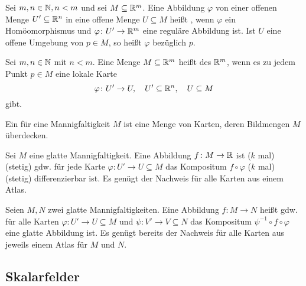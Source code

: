 \begin{definition}
Sei $m,n\in\mathbb N, n<m$ und sei $M\subseteq\mathbb R^m$.
Eine Abbildung $\varphi$ von einer offenen Menge $U'\subseteq\mathbb R^n$
in eine offene Menge $U\subseteq M$ heißt ,
wenn $\varphi$ ein Homöomorphismus und $\varphi\colon U'\to\mathbb R^m$
eine reguläre Abbildung ist. Ist $U$ eine offene Umgebung von
$p\in M$, so heißt $\varphi$  bezüglich $p$.
\end{definition}
\pagebreak[1]

\begin{definition}
Sei $m,n\in\mathbb N$ mit $n<m$. Eine Menge $M\subseteq\mathbb R^m$ heißt
 des $\mathbb R^m$, wenn
es zu jedem Punkt $p\in M$ eine lokale Karte
\begin{equation}
\varphi\colon U'\to U,\quad U'\subseteq\mathbb R^n,\quad U\subseteq M
\end{equation}
gibt.
\end{definition}

\begin{definition}[Atlas]
Ein  für eine Mannigfaltigkeit $M$
ist eine Menge von Karten, deren Bildmengen $M$ überdecken.
\end{definition}

\begin{definition}
Sei $M$ eine glatte Mannigfaltigkeit.
Eine Abbildung $f\colon M\to\mathbb R$ ist ($k$ mal) (stetig)
gdw. für jede Karte $\varphi\colon U'\to U\subseteq M$ das
Kompositum $f\circ\varphi$ ($k$ mal) (stetig) differenzierbar ist.
Es genügt der Nachweis für alle Karten aus einem Atlas.
\end{definition}

\begin{definition}
Seien $M,N$ zwei glatte Mannigfaltigkeiten.
Eine Abbildung $f\colon M\to N$ heißt 
gdw. für alle Karten $\varphi\colon U'\to U\subseteq M$ und
$\psi\colon V'\to V\subseteq N$ das Kompositum
$\psi^{-1}\circ f\circ\varphi$ eine glatte Abbildung ist.
Es genügt bereits der Nachweis für alle Karten aus jeweils einem
Atlas für $M$ und $N$.
\end{definition}

\subsection{Skalarfelder}
